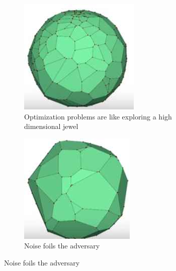 \documentclass[]{article}
\begin{document}
\begin{figure}[H]
	\begin{center}
		\caption{Smoothed Analysis}\label{fig:hs-jewel}
		\begin{subfigure}[t]{0.45\textwidth}
			\caption{Optimization problems are like exploring a high dimensional jewel}
			\includegraphics[width=\textwidth]{hs-jewel}
		\end{subfigure}
		\begin{subfigure}[t]{0.45\textwidth}
			\caption{Noise foils the adversary}
			\includegraphics[width=\textwidth]{hd-jewel2}
		\end{subfigure}
	\end{center}
\end{figure}
\end{document}
